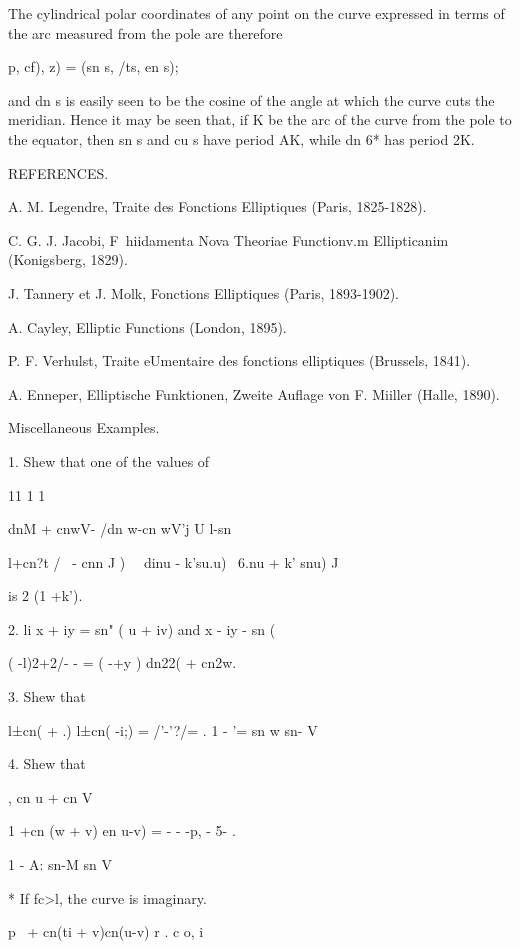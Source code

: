 The cylindrical polar coordinates of any point on the curve expressed
in terms of the arc measured from the pole are therefore

 p, cf), z) = (sn s, /ts, en s);

and dn s is easily seen to be the cosine of the angle at which the
curve cuts the meridian. Hence it may be seen that, if K be the arc of
the curve from the pole to the equator, then sn s and cu s have period
AK, while dn 6* has period 2K.

REFERENCES.

A. M. Legendre, Traite des Fonctions Elliptiques (Paris, 1825-1828).

C. G. J. Jacobi, F\ hiidamenta Nova Theoriae Functionv.m Ellipticanim
(Konigsberg, 1829).

J. Tannery et J. Molk, Fonctions Elliptiques (Paris, 1893-1902).

A. Cayley, Elliptic Functions (London, 1895).

P. F. Verhulst, Traite eUmentaire des fonctions elliptiques (Brussels,
1841).

A. Enneper, Elliptische Funktionen, Zweite Auflage von F. Miiller
(Halle, 1890).

Miscellaneous Examples.

1. Shew that one of the values of

11 1 1

dnM + cnwV- /dn w-cn wV'j U l-sn%

l+cn?t / \ - cnn J ) \ \ dinu - k'su.u) \ 6.nu + k' snu) J

is 2 (1 +k'). 

2. li x + iy = sn" ( u + iv) and x - iy - sn (%

 ( -l)2+2/- - = ( -+y ) dn22( + cn2w.


3. Shew that

 l±cn( + .) l±cn( -i;) = /'-'?/= . 1 - '= sn w sn- V

4. Shew that

, cn u + cn V

1 +cn (w + v) en u-v) = - - -p, - 5- .

  1 - A: sn-M sn V

 * If fc>l, the curve is imaginary.

%
%

p \ + cn(ti + v)cn(u-v) r . c o, i

